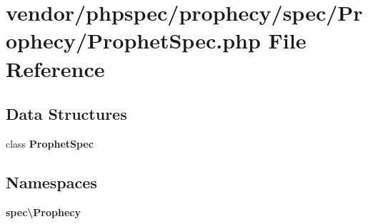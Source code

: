 \section{vendor/phpspec/prophecy/spec/\+Prophecy/\+Prophet\+Spec.php File Reference}
\label{_prophet_spec_8php}
\subsection*{Data Structures}
\begin{DoxyCompactItemize}
\item 
class {\bf Prophet\+Spec}
\end{DoxyCompactItemize}
\subsection*{Namespaces}
\begin{DoxyCompactItemize}
\item 
 {\bf spec\textbackslash{}\+Prophecy}
\end{DoxyCompactItemize}
